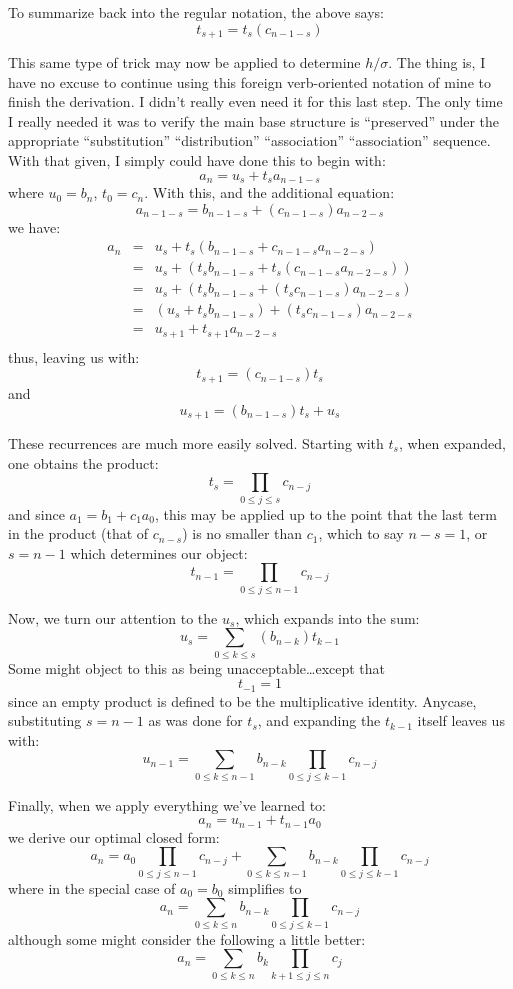 \documentclass[twoside]{article}
\begin{document}
To summarize back into the regular notation, the above says:
$$ t_{s+1}=t_s(c_{n-1-s}) $$

This same type of trick may now be applied to determine $ h/\sigma $.  The thing is, I have no excuse to continue
using this foreign verb-oriented notation of mine to finish the derivation.  I didn't really even need it for this
last step.  The only time I really needed it was to verify the main base structure is ``preserved'' under the
appropriate ``substitution'' ``distribution'' ``association'' ``association'' sequence.  With that given, I simply
could have done this to begin with:
$$ a_n=u_s+t_sa_{n-1-s} $$
where $ u_0=b_n $, $ t_0=c_n $.  With this, and the additional equation:
$$ a_{n-1-s}=b_{n-1-s}+(c_{n-1-s})a_{n-2-s} $$
we have:
\begin{eqnarray*}
a_n & = & u_s+t_s(b_{n-1-s}+c_{n-1-s}a_{n-2-s}) \\
 & = & u_s+(t_sb_{n-1-s}+t_s(c_{n-1-s}a_{n-2-s})) \\
 & = & u_s+(t_sb_{n-1-s}+(t_sc_{n-1-s})a_{n-2-s}) \\
 & = & (u_s+t_sb_{n-1-s})+(t_sc_{n-1-s})a_{n-2-s} \\
 & = & u_{s+1}+t_{s+1}a_{n-2-s} \\
\end{eqnarray*}
thus, leaving us with:
$$ t_{s+1}=(c_{n-1-s})t_s $$
and
$$ u_{s+1}=(b_{n-1-s})t_s+u_s $$

These recurrences are much more easily solved.  Starting with $ t_s $, when expanded, one obtains the product:
$$ t_s=\prod_{0\le j\le s}\!c_{n-j} $$
and since $ a_1=b_1+c_1a_0 $, this may be applied up to the point that the last term in the product (that of
$ c_{n-s} $) is no smaller than $ c_1 $, which to say $ n-s=1 $, or $ s=n-1 $ which determines our object:
$$ t_{n-1}=\prod_{0\le j\le n-1}\!\!\!\!\!c_{n-j} $$

Now, we turn our attention to the $ u_s $, which expands into the sum:
$$ u_s=\sum_{0\le k\le s}(b_{n-k})t_{k-1} $$
Some might object to this as being unacceptable\ldots except that 
$$ t_{-1}=1 $$
since an empty product is defined to be the multiplicative identity.  Anycase, substituting
$ s=n-1 $ as was done for $ t_s $, and expanding the $ t_{k-1} $ itself leaves us with:
$$ u_{n-1}=\sum_{0\le k\le n-1}\!\!\!\!\!\!b_{n-k}\prod_{0\le j\le k-1}\!\!\!\!\!c_{n-j} $$

Finally, when we apply everything we've learned to:
$$ a_n=u_{n-1}+t_{n-1}a_0 $$
we derive our optimal closed form:
$$ a_n=a_0\prod_{0\le j\le n-1}\!\!\!\!\!c_{n-j}
      +\sum_{0\le k\le n-1}\!\!\!\!\!\!b_{n-k}\prod_{0\le j\le k-1}\!\!\!\!\!c_{n-j} $$
where in the special case of $ a_0=b_0 $ simplifies to
$$ a_n=\sum_{0\le k\le n}\!\!\!b_{n-k}\prod_{0\le j\le k-1}\!\!\!\!\!c_{n-j} $$
although some might consider the following a little better:
$$ a_n=\sum_{0\le k\le n}\!\!\!b_k\prod_{k+1\le j\le n}\!\!\!\!\!c_j $$
\end{document}
